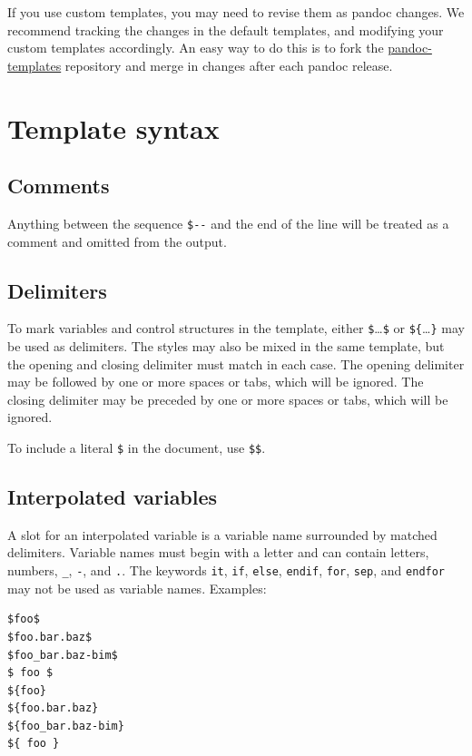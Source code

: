 \documentclass[
  b5paper
]{book}
\begin{document}
If you use custom templates, you may need to revise them as pandoc
changes. We recommend tracking the changes in the default templates, and
modifying your custom templates accordingly. An easy way to do this is
to fork the
\href{https://github.com/jgm/pandoc-templates}{pandoc-templates}
repository and merge in changes after each pandoc release.

\section{Template syntax}\label{template-syntax}

\subsection{Comments}\label{comments}

Anything between the sequence \texttt{\$-\/-} and the end of the line
will be treated as a comment and omitted from the output.

\subsection{Delimiters}\label{delimiters}

To mark variables and control structures in the template, either
\texttt{\$}\ldots{}\texttt{\$} or \texttt{\$\{}\ldots{}\texttt{\}} may
be used as delimiters. The styles may also be mixed in the same
template, but the opening and closing delimiter must match in each case.
The opening delimiter may be followed by one or more spaces or tabs,
which will be ignored. The closing delimiter may be preceded by one or
more spaces or tabs, which will be ignored.

To include a literal \texttt{\$} in the document, use \texttt{\$\$}.

\subsection{Interpolated variables}\label{interpolated-variables}

A slot for an interpolated variable is a variable name surrounded by
matched delimiters. Variable names must begin with a letter and can
contain letters, numbers, \texttt{\_}, \texttt{-}, and \texttt{.}. The
keywords \texttt{it}, \texttt{if}, \texttt{else}, \texttt{endif},
\texttt{for}, \texttt{sep}, and \texttt{endfor} may not be used as
variable names. Examples:

\begin{verbatim}
$foo$
$foo.bar.baz$
$foo_bar.baz-bim$
$ foo $
${foo}
${foo.bar.baz}
${foo_bar.baz-bim}
${ foo }
\end{verbatim}
\end{document}
